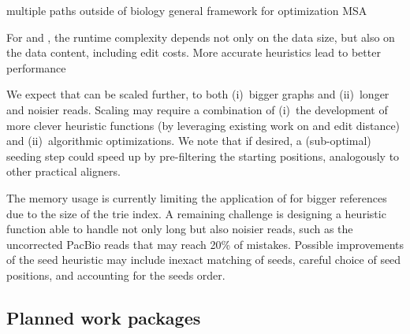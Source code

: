 multiple paths
outside of biology
general framework for optimization
MSA

For \dijkstra and \astarix, the runtime complexity depends not only on the data
size, but also on the data content, including edit costs. More accurate
heuristics lead to better \A performance~\cite{pearl_discovery_1983}

We expect that \astarix can be scaled further, to both (i)~bigger graphs and
(ii)~longer and noisier reads. Scaling \astarix may require a combination of
(i)~the development of more clever heuristic functions (by leveraging existing
work on \A and edit distance) and (ii)~algorithmic optimizations. We note that
if desired, a (sub-optimal) seeding step could speed up \astarix by
pre-filtering the starting positions, analogously to other practical aligners.

The memory usage is currently limiting the application of \astarix for bigger
references due to the size of the trie index. A remaining challenge is designing
a heuristic function able to handle not only long but also noisier reads, such
as the uncorrected PacBio reads that may reach 20\% of mistakes. Possible
improvements of the seed heuristic may include inexact matching of seeds,
careful choice of seed positions, and accounting for the seeds order.

\subsection{Planned work packages}

